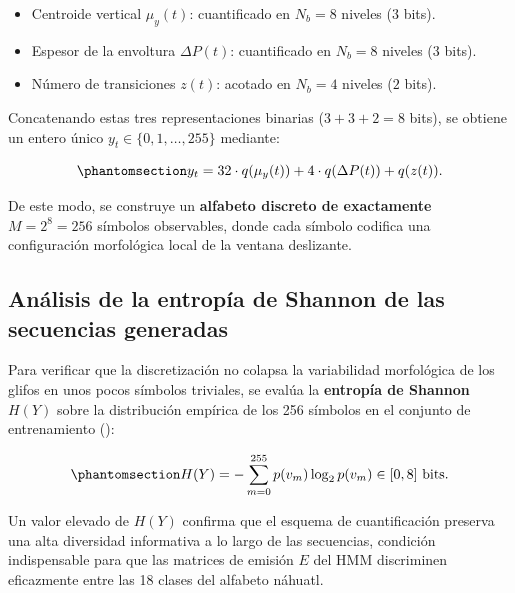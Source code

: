 \documentclass[
  spanish,
  us-letterpaper,
]{scrreprt}
\providecommand{\tightlist}{%
  \setlength{\itemsep}{0pt}\setlength{\parskip}{0pt}}
\theoremstyle{definition}
\theoremstyle{remark}
\begin{document}
\begin{itemize}
\tightlist
\item
  Centroide vertical \(\mu_y(t)\): cuantificado en \(N_b = 8\) niveles
  (\(3\) bits).
\item
  Espesor de la envoltura \(\Delta P(t)\): cuantificado en \(N_b = 8\)
  niveles (\(3\) bits).
\item
  Número de transiciones \(z(t)\): acotado en \(N_b = 4\) niveles (\(2\)
  bits).
\end{itemize}

Concatenando estas tres representaciones binarias (\(3 + 3 + 2 = 8\)
bits), se obtiene un entero único \(y_t \in \{0, 1, \dots, 255\}\)
mediante:

\begin{equation}\phantomsection\label{eq-codificacion-8bits}{
y_t = 32 \cdot q(\mu_y(t)) + 4 \cdot q(\Delta P(t)) + q(z(t)).
}\end{equation}

De este modo, se construye un \textbf{alfabeto discreto de exactamente}
\(M = 2^8 = 256\) símbolos observables, donde cada símbolo codifica una
configuración morfológica local de la ventana deslizante.

\subsection{Análisis de la entropía de Shannon de las secuencias
generadas}\label{anuxe1lisis-de-la-entropuxeda-de-shannon-de-las-secuencias-generadas}

Para verificar que la discretización no colapsa la variabilidad
morfológica de los glifos en unos pocos símbolos triviales, se evalúa la
\textbf{entropía de Shannon} \(H(Y)\) sobre la distribución empírica de
los 256 símbolos en el conjunto de entrenamiento
():

\begin{equation}\phantomsection\label{eq-entropia-shannon}{
H(Y) = - \sum_{m=0}^{255} p(v_m) \log_2 p(v_m) \in [0, 8] \text{ bits}.
}\end{equation}

Un valor elevado de \(H(Y)\) confirma que el esquema de cuantificación
preserva una alta diversidad informativa a lo largo de las secuencias,
condición indispensable para que las matrices de emisión \(E\) del HMM
discriminen eficazmente entre las 18 clases del alfabeto náhuatl.

\end{document}
